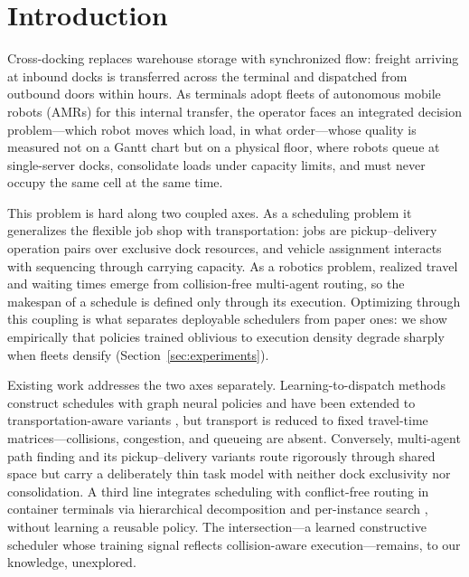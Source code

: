 \section{Introduction}
\label{sec:intro}

Cross-docking replaces warehouse storage with synchronized flow:
freight arriving at inbound docks is transferred across the terminal
and dispatched from outbound doors within hours. As terminals adopt
fleets of autonomous mobile robots (AMRs) for this internal transfer,
the operator faces an integrated decision problem---which robot moves
which load, in what order---whose quality is measured not on a Gantt
chart but on a physical floor, where robots queue at single-server
docks, consolidate loads under capacity limits, and must never occupy
the same cell at the same time.

This problem is hard along two coupled axes. As a scheduling problem
it generalizes the flexible job shop with transportation: jobs are
pickup--delivery operation pairs over exclusive dock resources, and
vehicle assignment interacts with sequencing through carrying capacity.
As a robotics problem, realized travel and waiting times emerge from
collision-free multi-agent routing, so the makespan of a schedule is
defined only through its execution. Optimizing through this coupling
is what separates deployable schedulers from paper ones: we show
empirically that policies trained oblivious to execution density
degrade sharply when fleets densify
(Section~\ref{sec:experiments}).

Existing work addresses the two axes separately.
Learning-to-dispatch methods construct schedules with graph neural
policies \cite{zhang2020l2d,song2023fjsp} and have been extended to
transportation-aware variants \cite{moon2024hgs}, but transport is
reduced to fixed travel-time matrices---collisions, congestion, and
queueing are absent. Conversely, multi-agent path finding and its
pickup--delivery variants \cite{stern2019mapf,ma2017lifelong} route
rigorously through shared space but carry a deliberately thin task
model with neither dock exclusivity nor consolidation. A third line
integrates scheduling with conflict-free routing in container
terminals via hierarchical decomposition and per-instance search
\cite{zhong2020integrated,hierarchical2024agv}, without learning a
reusable policy. The intersection---a learned constructive scheduler
whose training signal reflects collision-aware execution---remains,
to our knowledge, unexplored.

